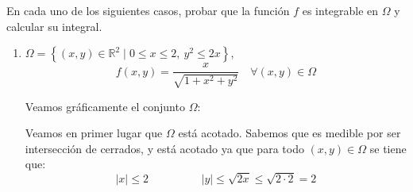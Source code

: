 \begin{ejercicio}
    En cada uno de los siguientes casos, probar que la función \( f \) es integrable en \( \Omega \) y calcular su integral.
    \begin{enumerate}
        \item \(\Omega = \left\{ (x, y) \in \mathbb{R}^2 \mid 0 \leq x \leq 2,~y^2 \leq 2x \right\} \),
        \[ f(x, y) = \frac{x}{\sqrt{1 + x^2 + y^2}} \quad \forall (x, y) \in \Omega \]

        Veamos gráficamente el conjunto $\Omega$:
        \begin{figure}[H]
            \centering
        \end{figure}

        Veamos en primer lugar que $\Omega$ está acotado. Sabemos que es medible por ser intersección de cerrados, y está acotado ya que
        para todo $(x, y) \in \Omega$ se tiene que:
        \begin{equation*}
            |x|\leq 2
            \hspace{2cm}
            |y|\leq \sqrt{2x} \leq \sqrt{2\cdot 2} = 2
        \end{equation*}


\end{enumerate}
\end{ejercicio}
